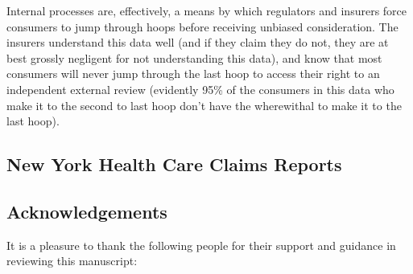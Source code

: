 \documentclass[psamsfonts]{amsart}
\theoremstyle{plain}
\theoremstyle{definition}
\theoremstyle{remark}
\begin{document}
Internal processes are, effectively, a means by which regulators and insurers force consumers to jump through hoops before receiving unbiased consideration. The insurers understand this data well (and if they claim they do not, they are at best grossly negligent for not understanding this data), and know that most consumers will never jump through the last hoop to access their right to an independent external review (evidently 95\% of the consumers in this data who make it to the second to last hoop don't have the wherewithal to make it to the last hoop).\\


\subsection{New York Health Care Claims Reports}



\subsection{Acknowledgements}
It is a pleasure to thank the following people for their support and guidance in reviewing this manuscript:






	
\end{document}
